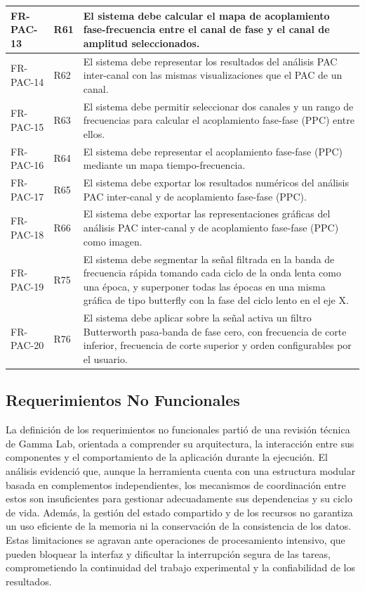 \documentclass[12pt, letterpaper]{article}
\begin{document}
\begin{longtable}{|p{2.5cm}|p{2.5cm}|p{10.1cm}|}
FR-PAC-13 & R61 & El sistema debe calcular el mapa de acoplamiento fase-frecuencia entre el canal de fase y el canal de amplitud seleccionados. \\
\hline
FR-PAC-14 & R62 & El sistema debe representar los resultados del análisis PAC inter-canal con las mismas visualizaciones que el PAC de un canal. \\
\hline
FR-PAC-15 & R63 & El sistema debe permitir seleccionar dos canales y un rango de frecuencias para calcular el acoplamiento fase-fase (PPC) entre ellos. \\
\hline
FR-PAC-16 & R64 & El sistema debe representar el acoplamiento fase-fase (PPC) mediante un mapa tiempo-frecuencia. \\
\hline
FR-PAC-17 & R65 & El sistema debe exportar los resultados numéricos del análisis PAC inter-canal y de acoplamiento fase-fase (PPC). \\
\hline
FR-PAC-18 & R66 & El sistema debe exportar las representaciones gráficas del análisis PAC inter-canal y de acoplamiento fase-fase (PPC) como imagen. \\
\hline
FR-PAC-19 & R75 & El sistema debe segmentar la señal filtrada en la banda de frecuencia rápida tomando cada ciclo de la onda lenta como una época, y superponer todas las épocas en una misma gráfica de tipo butterfly con la fase del ciclo lento en el eje X. \\
\hline
FR-PAC-20 & R76 & El sistema debe aplicar sobre la señal activa un filtro Butterworth pasa-banda de fase cero, con frecuencia de corte inferior, frecuencia de corte superior y orden configurables por el usuario. \\

\end{longtable}
\vspace{-0.5em}
\label{tab:fr-pac}

\subsection{Requerimientos No Funcionales}

La definición de los requerimientos no funcionales partió de una revisión técnica de Gamma Lab, orientada a comprender su arquitectura, la interacción entre sus componentes y el comportamiento de la aplicación durante la ejecución. El análisis evidenció que, aunque la herramienta cuenta con una estructura modular basada en complementos independientes, los mecanismos de coordinación entre estos son insuficientes para gestionar adecuadamente sus dependencias y su ciclo de vida. Además, la gestión del estado compartido y de los recursos no garantiza un uso eficiente de la memoria ni la conservación de la consistencia de los datos. Estas limitaciones se agravan ante operaciones de procesamiento intensivo, que pueden bloquear la interfaz y dificultar la interrupción segura de las tareas, comprometiendo la continuidad del trabajo experimental y la confiabilidad de los resultados.
\end{document}

